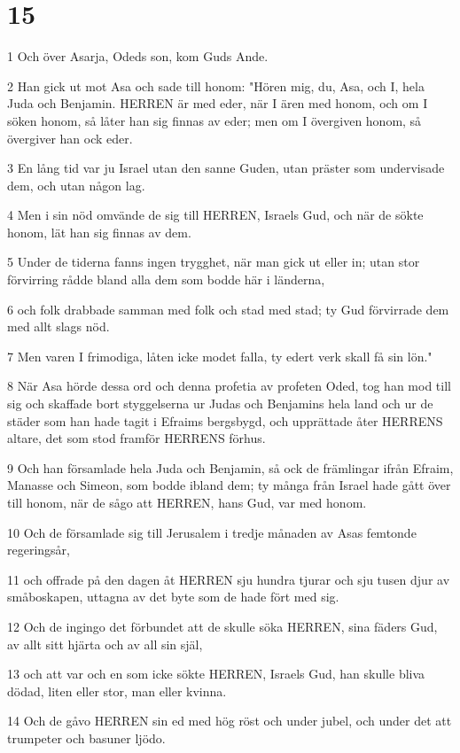 \chapter{15}

\par 1 Och över Asarja, Odeds son, kom Guds Ande.
\par 2 Han gick ut mot Asa och sade till honom: "Hören mig, du, Asa, och I, hela Juda och Benjamin. HERREN är med eder, när I ären med honom, och om I söken honom, så låter han sig finnas av eder; men om I övergiven honom, så övergiver han ock eder.
\par 3 En lång tid var ju Israel utan den sanne Guden, utan präster som undervisade dem, och utan någon lag.
\par 4 Men i sin nöd omvände de sig till HERREN, Israels Gud, och när de sökte honom, lät han sig finnas av dem.
\par 5 Under de tiderna fanns ingen trygghet, när man gick ut eller in; utan stor förvirring rådde bland alla dem som bodde här i länderna,
\par 6 och folk drabbade samman med folk och stad med stad; ty Gud förvirrade dem med allt slags nöd.
\par 7 Men varen I frimodiga, låten icke modet falla, ty edert verk skall få sin lön."
\par 8 När Asa hörde dessa ord och denna profetia av profeten Oded, tog han mod till sig och skaffade bort styggelserna ur Judas och Benjamins hela land och ur de städer som han hade tagit i Efraims bergsbygd, och upprättade åter HERRENS altare, det som stod framför HERRENS förhus.
\par 9 Och han församlade hela Juda och Benjamin, så ock de främlingar ifrån Efraim, Manasse och Simeon, som bodde ibland dem; ty många från Israel hade gått över till honom, när de sågo att HERREN, hans Gud, var med honom.
\par 10 Och de församlade sig till Jerusalem i tredje månaden av Asas femtonde regeringsår,
\par 11 och offrade på den dagen åt HERREN sju hundra tjurar och sju tusen djur av småboskapen, uttagna av det byte som de hade fört med sig.
\par 12 Och de ingingo det förbundet att de skulle söka HERREN, sina fäders Gud, av allt sitt hjärta och av all sin själ,
\par 13 och att var och en som icke sökte HERREN, Israels Gud, han skulle bliva dödad, liten eller stor, man eller kvinna.
\par 14 Och de gåvo HERREN sin ed med hög röst och under jubel, och under det att trumpeter och basuner ljödo.
